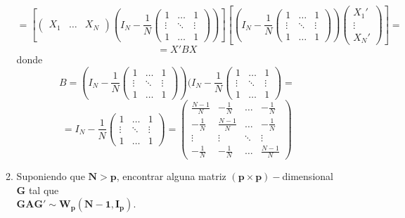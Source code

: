 \documentclass[11pt,a4paper]{article}
\begin{document}
\begin{enumerate}[label=\arabic*.]
\begin{enumerate}[label=(\alph*)]
$$= [\begin{pmatrix}
X_{1} & \dots & X_{N}
\end{pmatrix} (I_{N} - \frac{1}{N} \begin{pmatrix}
1 & \dots & 1 \\
\vdots & \ddots & \vdots \\
1 & \dots & 1
\end{pmatrix})][(I_{N} - \frac{1}{N} \begin{pmatrix}
1 & \dots & 1 \\
\vdots & \ddots & \vdots \\
1 & \dots & 1
\end{pmatrix}) \begin{pmatrix}
X_{1}' \\ \vdots \\ X_{N}'
\end{pmatrix}] =$$
$$= X' B X$$
donde
$$B = (I_{N} - \frac{1}{N} \begin{pmatrix}
1 & \dots & 1 \\
\vdots & \ddots & \vdots \\
1 & \dots & 1
\end{pmatrix}) (I_{N} - \frac{1}{N} \begin{pmatrix}
1 & \dots & 1 \\
\vdots & \ddots & \vdots \\
1 & \dots & 1
\end{pmatrix} =$$
$$= I_{N} - \frac{1}{N} \begin{pmatrix}
1 & \dots & 1 \\
\vdots & \ddots & \vdots \\
1 & \dots & 1
\end{pmatrix} = \begin{pmatrix}
\frac{N-1}{N} & -\frac{1}{N} & \dots & -\frac{1}{N} \\
-\frac{1}{N} & \frac{N-1}{N} & \dots & -\frac{1}{N} \\
\vdots & \vdots & \ddots & \vdots \\
-\frac{1}{N} & - \frac{1}{N} & \dots & \frac{N-1}{N}
\end{pmatrix}$$

\vspace{1cm}
\bfseries
\item Suponiendo que $\mathbf{N > p}$, encontrar alguna matriz $\mathbf{(p \times p)-}$dimensional $\mathbf{G}$ tal que \\ $\mathbf{GAG' \sim W_{p}(N-1,I_{p})}$.

\vspace{0.5cm}
\normalfont


\end{enumerate}
\end{enumerate}
\end{document}

